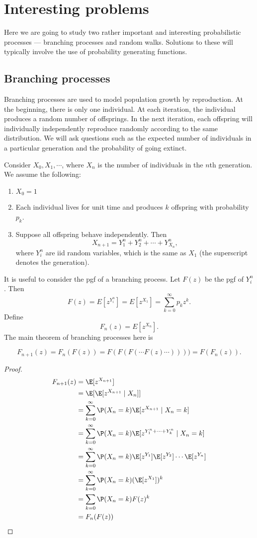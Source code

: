 \documentclass[a4paper]{article}
\begin{document}
\section{Interesting problems}
Here we are going to study two rather important and interesting probabilistic processes --- branching processes and random walks. Solutions to these will typically involve the use of probability generating functions.

\subsection{Branching processes}
Branching processes are used to model population growth by reproduction. At the beginning, there is only one individual. At each iteration, the individual produces a random number of offsprings. In the next iteration, each offspring will individually independently reproduce randomly according to the same distribution. We will ask questions such as the expected number of individuals in a particular generation and the probability of going extinct.

Consider $X_0, X_1, \cdots$, where $X_n$ is the number of individuals in the $n$th generation. We assume the following:
\begin{enumerate}
  \item $X_0 = 1$
  \item Each individual lives for unit time and produces $k$ offspring with probability $p_k$.
  \item Suppose all offspring behave independently. Then
    \[
      X_{n + 1} = Y_1^n + Y_2^n + \cdots + Y_{X_n}^n,
    \]
    where $Y_i^n$ are iid random variables, which is the same as $X_1$ (the superscript denotes the generation).
\end{enumerate}
It is useful to consider the pgf of a branching process. Let $F(z)$ be the pgf of $Y_i^n$. Then
\[
  F(z) = E[z^{Y_i^n}] = E[z^{X_1}] = \sum_{k = 0}^\infty p_k z^k.
\]
Define
\[
  F_n(z) = E[z^{X_n}].
\]
The main theorem of branching processes here is
\begin{thm}
  \[
    F_{n + 1}(z) = F_n(F(z)) = F(F(F(\cdots F(z) \cdots )))) = F(F_n(z)).
  \]
\end{thm}

\begin{proof}
  \begin{align*}
    F_{n + 1}(z) &= \E[z^{X_{n + 1}}]\\
    &= \E[\E[z^{X_{n + 1}}\mid X_n]]\\
    &= \sum_{k = 0}^\infty \P(X_n = k)\E[z^{X_{n + 1}}\mid X_n = k]\\
    &= \sum_{k = 0}^\infty \P(X_n = k)\E[z^{Y_1^n + \cdots + Y_k^n}\mid X_n = k]\\
    &= \sum_{k = 0}^\infty \P(X_n = k)\E[z^{Y_1}]\E[z^{Y_2}]\cdots\E[z^{Y_n}]\\
    &= \sum_{k = 0}^\infty \P(X_n = k)(\E[z^{X_1}])^k\\
    &= \sum_{k = 0}\P(X_n = k)F(z)^k\\
    &= F_n(F(z))
  \end{align*}
\end{proof}
\end{document}
